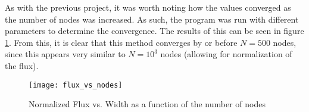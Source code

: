 \documentclass[../main.tex]{subfiles}
\begin{document}
As with the previous project, it was worth noting how the values converged as the number of nodes was increased. As such, the program was run with different parameters to determine the convergence. The results of this can be seen in figure \ref{fig:flux_vs_nodes}. From this, it is clear that this method converges by or before $N=500$ nodes, since this appears very similar to $N=10^3$ nodes (allowing for normalization of the flux).

\begin{figure}
\centering
\texttt{[image: flux\_vs\_nodes]}
\caption{Normalized Flux vs. Width as a function of the number of nodes}
\label{fig:flux_vs_nodes}
\end{figure}
\end{document}
